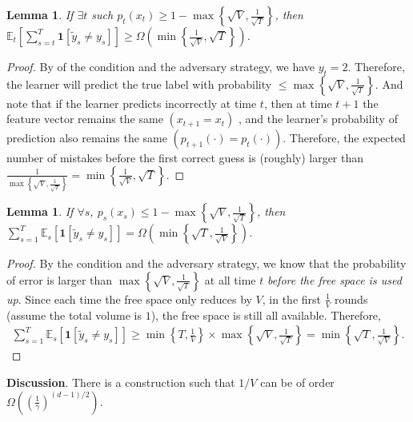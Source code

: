 \documentclass{article}
\newcommand{\one}{\boldsymbol{1}}
\newcommand{\field}[1]{\mathbb{#1}}
\newcommand{\E}{\field{E}}
\newtheorem{lemma}[theorem]{Lemma}
\begin{document}
\begin{lemma}
If $\exists t$ such $p_t(x_t)\geq 1-\max\left\{ \sqrt{V}, \frac{1}{\sqrt{T}} \right\}$, then $\E_t\left[ \sum_{s=t}^T  \one[\tilde{y}_s\neq y_s] \right] \geq \Omega\left(\min\left\{\frac{1}{\sqrt{V}},\sqrt{T}\right\}\right)$.
\end{lemma}
\begin{proof}
By of the condition and the adversary strategy, we have $y_t=2$. Therefore, the learner will predict the true label with probability $\leq \max \left\{ \sqrt{V}, \frac{1}{\sqrt{T}} \right\}$. And note that if the learner predicts incorrectly at time $t$, then at time $t+1$ the feature vector remains the same $(x_{t+1}=x_t)$ , and the learner's probability of prediction also remains the same $(p_{t+1}(\cdot)=p_t(\cdot))$. Therefore, the expected number of mistakes before the first correct guess is (roughly) larger than  $\frac{1}{\max\left\{\sqrt{V}, \frac{1}{\sqrt{T}}\right\}}=\min\left\{\frac{1}{\sqrt{V}}, \sqrt{T}\right\}$. 
\end{proof}

\begin{lemma}
If $\forall s$, $p_s(x_s)\leq 1-\max\left\{\sqrt{V}, \frac{1}{\sqrt{T}}\right\}$, then $\sum_{s=1}^T \E_s[\one[\tilde{y}_s\neq y_s]] = \Omega\left(\min\left\{\sqrt{T}, \frac{1}{\sqrt{V}}\right\}\right)$.
\end{lemma}

\begin{proof}
By the condition and the adversary strategy, we know that the probability of error is larger than $\max\left\{\sqrt{V},\frac{1}{\sqrt{T}}\right\}$ at all time $t$ \textit{before the free space is used up}. Since each time the free space only reduces by $V$, in the first $\frac{1}{V}$ rounds (assume the total volume is $1$), the free space is still all available. Therefore, 
\begin{align*}
    \sum_{s=1}^T \E_s[\one[\tilde{y}_s\neq y_s]] \geq \min\left\{ T,\frac{1}{V} \right\}\times \max\left\{ \sqrt{V}, \frac{1}{\sqrt{T}} \right\}=\min\left\{\sqrt{T}, \frac{1}{\sqrt{V}}\right\}. 
\end{align*}
\end{proof}

\textbf{Discussion}. There is a construction such that $1/V$ can be of order $\Omega\left( \left(\frac{1}{\gamma}\right)^{(d-1)/2} \right)$. 

\end{document}
